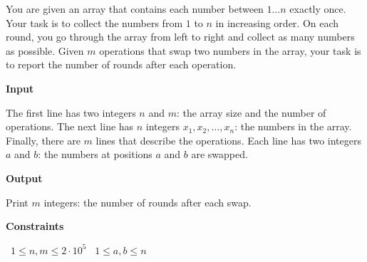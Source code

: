 You are given an array that contains each number between $1 \dots n$ exactly once. Your task is to collect the numbers from $1$ to $n$ in increasing order.
On each round, you go through the array from left to right and collect as many numbers as possible.
Given $m$ operations that swap two numbers in the array, your task is to report the number of rounds after each operation.

\vspace{0.3cm}\noindent\textbf{Input}

The first line has two integers $n$ and $m$: the array size and the number of operations.
The next line has $n$ integers $x_1,x_2,\dots,x_n$: the numbers in the array.
Finally, there are $m$ lines that describe the operations. Each line has two integers $a$ and $b$: the numbers at positions $a$ and $b$ are swapped.

\vspace{0.3cm}\noindent\textbf{Output}

Print $m$ integers: the number of rounds after each swap.

\vspace{0.3cm}\noindent\textbf{Constraints}

\textbullet\ $1 \le n, m \le 2 \cdot 10^5$
\textbullet\ $1 \le a,b \le n$